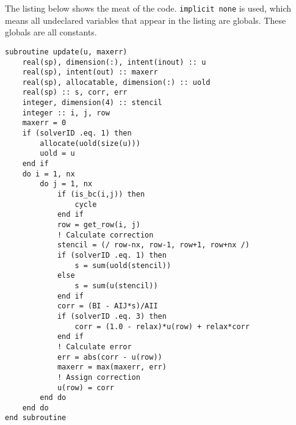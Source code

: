 
The listing below shows the meat of the code.
\texttt{implicit none} is used,
which means all undeclared variables that appear in the listing are globals.
These globals are all constants.
\begin{lstlisting}[caption={Relevant part of the linear solver.
\texttt{solverID} is a global integer variable that has the mapping:
1=Jacobi, 2=Gauss, 3=SOR},
label=lst:fortran]
subroutine update(u, maxerr)
    real(sp), dimension(:), intent(inout) :: u
    real(sp), intent(out) :: maxerr
    real(sp), allocatable, dimension(:) :: uold
    real(sp) :: s, corr, err
    integer, dimension(4) :: stencil
    integer :: i, j, row
    maxerr = 0
    if (solverID .eq. 1) then
        allocate(uold(size(u)))
        uold = u
    end if
    do i = 1, nx
        do j = 1, nx
            if (is_bc(i,j)) then
                cycle
            end if
            row = get_row(i, j)
            ! Calculate correction
            stencil = (/ row-nx, row-1, row+1, row+nx /)
            if (solverID .eq. 1) then
                s = sum(uold(stencil))
            else
                s = sum(u(stencil))
            end if
            corr = (BI - AIJ*s)/AII
            if (solverID .eq. 3) then
                corr = (1.0 - relax)*u(row) + relax*corr
            end if
            ! Calculate error
            err = abs(corr - u(row))
            maxerr = max(maxerr, err)
            ! Assign correction
            u(row) = corr
        end do
    end do
end subroutine
\end{lstlisting}
